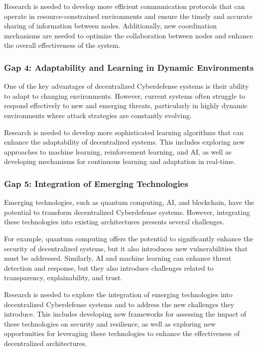 Research is needed to develop more efficient communication protocols that can operate in resource-constrained environments and ensure the timely and accurate sharing of information between nodes. Additionally, new coordination mechanisms are needed to optimize the collaboration between nodes and enhance the overall effectiveness of the system.

\subsubsection{Gap 4: Adaptability and Learning in Dynamic Environments}

One of the key advantages of decentralized Cyberdefense systems is their ability to adapt to changing environments. However, current systems often struggle to respond effectively to new and emerging threats, particularly in highly dynamic environments where attack strategies are constantly evolving.

Research is needed to develop more sophisticated learning algorithms that can enhance the adaptability of decentralized systems. This includes exploring new approaches to machine learning, reinforcement learning, and AI, as well as developing mechanisms for continuous learning and adaptation in real-time.

\subsubsection{Gap 5: Integration of Emerging Technologies}

Emerging technologies, such as quantum computing, AI, and blockchain, have the potential to transform decentralized Cyberdefense systems. However, integrating these technologies into existing architectures presents several challenges.

For example, quantum computing offers the potential to significantly enhance the security of decentralized systems, but it also introduces new vulnerabilities that must be addressed. Similarly, AI and machine learning can enhance threat detection and response, but they also introduce challenges related to transparency, explainability, and trust.

Research is needed to explore the integration of emerging technologies into decentralized Cyberdefense systems and to address the new challenges they introduce. This includes developing new frameworks for assessing the impact of these technologies on security and resilience, as well as exploring new opportunities for leveraging these technologies to enhance the effectiveness of decentralized architectures.

